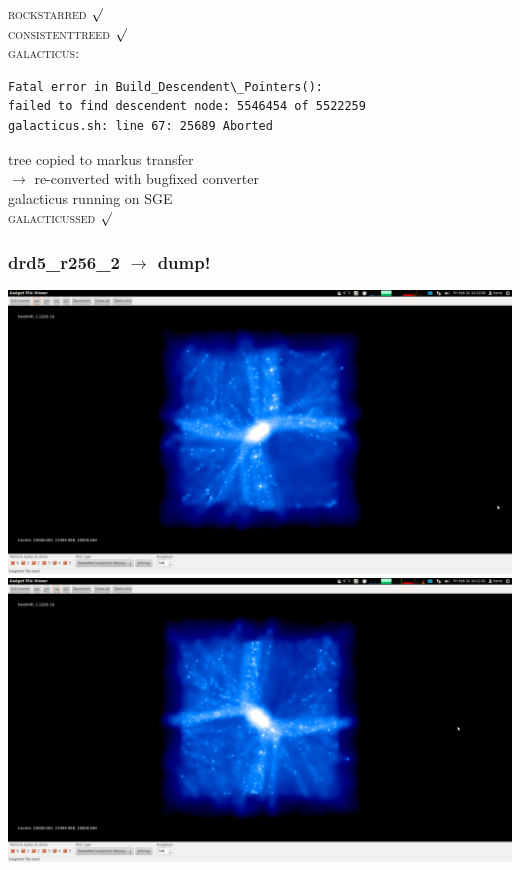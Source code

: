 \documentclass[a4paper,11pt,fleqn,oneside]{book}
\begin{document}
\textsc{rockstarred} $\surd$ \\ \textsc{consistenttreed} $\surd$  \\ \textsc{galacticus}: 
\begin{verbatim}
Fatal error in Build_Descendent\_Pointers():
failed to find descendent node: 5546454 of 5522259
galacticus.sh: line 67: 25689 Aborted  
\end{verbatim}
tree copied to markus transfer \\
$\rightarrow$ re-converted with bugfixed converter \\
galacticus running on SGE \\
\textsc{galacticussed} $\surd$ 

\newpage
\subsubsection{drd5\_r256\_2 $\rightarrow$ dump!} 

\includegraphics[scale=0.12]{drd5_r256_2/1.png} 
\includegraphics[scale=0.12]{drd5_r256_2/2.png} 
\end{document}
